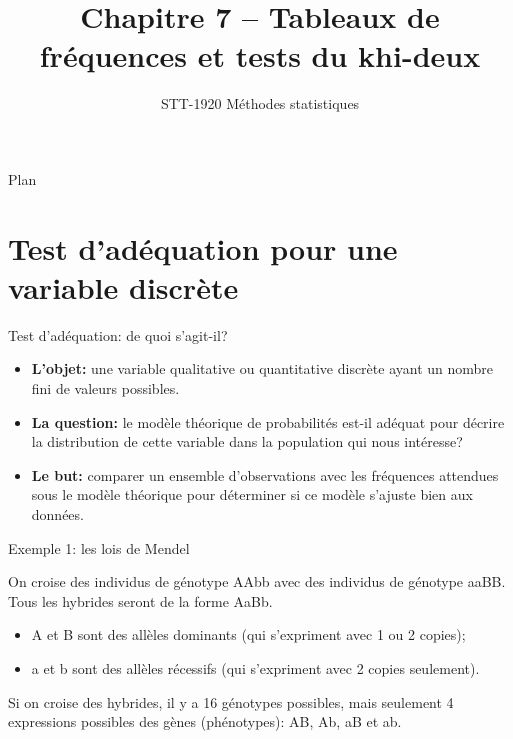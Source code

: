 \documentclass{BeamerTemplate}
\title{Chapitre 7 -- Tableaux de fréquences et tests du khi-deux}
\subtitle{STT-1920 Méthodes statistiques}
\date{}
\begin{document}
\begin{frame}[t]
  \titlepage
\end{frame}

\begin{frame}[t]{Plan}
\tableofcontents
\end{frame}

\section{Test d'adéquation pour une variable discrète}

\begin{frame}[t]{Test d'adéquation: de quoi s'agit-il?}

\begin{itemize}\itemsep4mm
  \item \textbf{L'objet:} une variable qualitative ou quantitative discrète ayant un
  nombre fini de valeurs possibles.
  \item<2-> \textbf{La question:} le \alert{modèle théorique} de probabilités est-il
  adéquat pour décrire la distribution de cette variable dans la population qui
  nous intéresse?
  \item<3-> \textbf{Le but:} comparer un ensemble d'observations avec les
  \alert{fréquences attendues} sous le modèle théorique pour déterminer si ce
  modèle s'ajuste bien aux données.
\end{itemize}

\end{frame}

\begin{frame}[t]{Exemple 1: les lois de Mendel}

On croise des individus de génotype AAbb avec des individus de génotype aaBB.
Tous les hybrides seront de la forme AaBb.

\begin{itemize}
  \item A et B sont des allèles \alert{dominants} (qui s'expriment avec 1 ou 2 copies);
  \item a et b sont des allèles \alert{récessifs} (qui s'expriment avec 2 copies
  seulement).
\end{itemize}

\medskip
Si on croise des hybrides, il y a 16 génotypes possibles, mais seulement
4 expressions possibles des gènes (\alert{phénotypes}): AB, Ab, aB et ab.

\end{frame}
\end{document}
